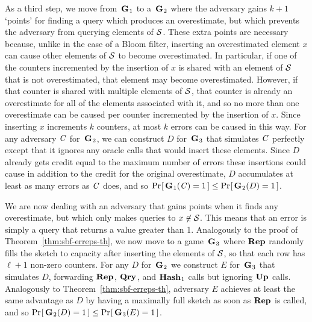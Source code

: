 As a third step, we move from~$\textup{\textbf{G}}\hspace{0.5pt}_1$ to a~$\textup{\textbf{G}}\hspace{0.5pt}_2$ where the adversary gains
$k+1$ `points' for finding a query which produces an
overestimate, but which prevents the adversary from querying elements of $\mathcal{S}$.
These extra points are necessary because, unlike in the case of a Bloom
filter, inserting an overestimated element $x$ can cause other elements of
$\mathcal{S}$ to become overestimated. In particular, if one of the counters
incremented by the insertion of $x$ is shared with an element of $\mathcal{S}$ that is
not overestimated, that element may become overestimated. However, if that
counter is shared with multiple elements of $\mathcal{S}$, that counter is already an
overestimate for all of the elements associated with it, and so no more than one
overestimate can be caused per counter incremented by the insertion of $x$.
Since inserting $x$ increments $k$ counters, at most $k$ errors can be caused in
this way. For any adversary $\mathit{C}$ for~$\textup{\textbf{G}}\hspace{0.5pt}_2$, we can construct $D$
for~$\textup{\textbf{G}}\hspace{0.5pt}_3$ that simulates $\mathit{C}$ perfectly except that it ignores any oracle
calls that would insert these elements. Since $D$ already gets credit equal to
the maximum number of errors these insertions could cause in addition to the
credit for the original overestimate, $D$ accumulates at least as many errors as
$\mathit{C}$ does, and so $\Pr\hspace{-1pt}\left[\,\textup{\textbf{G}}\hspace{0.5pt}_1(\mathit{C}) = 1\,\right] \le \Pr\hspace{-1pt}\left[\,\textup{\textbf{G}}\hspace{0.5pt}_2(D) = 1\,\right]$.

We are now dealing with an adversary that gains points when it finds any
overestimate, but which only makes queries to $x\not\in\mathcal{S}$. This means that an
error is simply a query that returns a value greater than 1.
Analogously to the proof of Theorem~\ref{thm:sbf-erreps-th}, we now move to a
game~$\textup{\textbf{G}}\hspace{0.5pt}_3$ where $\textup{\textbf{Rep}}\hspace{0.5pt}$ randomly fills the sketch to capacity after
inserting the elements of $\mathcal{S}$, so that each row has $\ell+1$ non-zero
counters. For any $D$ for~$\textup{\textbf{G}}\hspace{0.5pt}_2$ we construct $E$ for~$\textup{\textbf{G}}\hspace{0.5pt}_3$ that
simulates $D$, forwarding $\textup{\textbf{Rep}}\hspace{0.5pt}$, $\textup{\textbf{Qry}}\hspace{0.5pt}$, and $\textup{\textbf{Hash}}\hspace{0.5pt}_1$ calls but ignoring
$\textup{\textbf{Up}}\hspace{0.5pt}$ calls. Analogously to Theorem~\ref{thm:sbf-erreps-th}, adversary $E$ achieves at least the same
advantage as $D$ by having a maximally full sketch as soon as $\textup{\textbf{Rep}}\hspace{0.5pt}$ is called,
and so $\Pr\hspace{-1pt}\left[\,\textup{\textbf{G}}\hspace{0.5pt}_2(D) = 1\,\right] \le \Pr\hspace{-1pt}\left[\,\textup{\textbf{G}}\hspace{0.5pt}_3(E) = 1\,\right]$.

